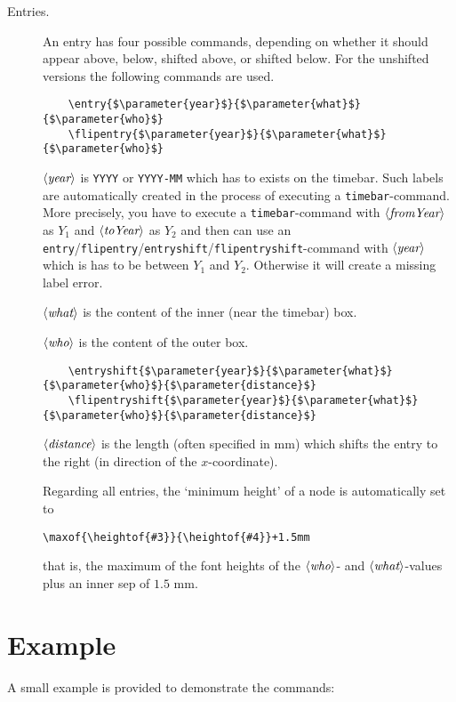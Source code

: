 \documentclass{article}
\newcommand{\parameter}[1]{\langle\normalfont\textit{#1}\rangle}
\begin{document}
\begin{description}
\item[Entries.] An entry has four possible commands, depending on whether it should appear above, below, shifted above, or shifted below. 
For the unshifted versions the following commands are used.
\begin{lstlisting}
	\entry{$\parameter{year}$}{$\parameter{what}$}{$\parameter{who}$}
	\flipentry{$\parameter{year}$}{$\parameter{what}$}{$\parameter{who}$}
\end{lstlisting}
$\parameter{year}$ is \texttt{YYYY} or \texttt{YYYY-MM} which has to exists on the timebar. 
Such labels are automatically created in the process of executing a \texttt{timebar}-command. 
More precisely, you have to execute a \texttt{timebar}-command with $\parameter{fromYear}$ as $Y_1$ and $\parameter{toYear}$ as $Y_2$ and then can use an \texttt{entry}/\texttt{flipentry}/\texttt{entryshift}/\texttt{flipentryshift}-command with $\parameter{year}$ which is has to be between $Y_1$ and $Y_2$.
Otherwise it will create a missing label error.

$\parameter{what}$ is the content of the inner (near the timebar) box.

$\parameter{who}$ is the content of the outer box.

\begin{lstlisting}
	\entryshift{$\parameter{year}$}{$\parameter{what}$}{$\parameter{who}$}{$\parameter{distance}$}
	\flipentryshift{$\parameter{year}$}{$\parameter{what}$}{$\parameter{who}$}{$\parameter{distance}$}
\end{lstlisting}

$\parameter{distance}$ is the length (often specified in mm) which shifts the entry to the right (in direction of the $x$-coordinate).

Regarding all entries, the `minimum height' of a node is automatically set to 
\begin{center}
\verb'\maxof{\heightof{#3}}{\heightof{#4}}+1.5mm'
\end{center}
that is, the maximum of the font heights of the $\parameter{who}$- and $\parameter{what}$-values plus an inner sep of $1.5$ mm.
\end{description}

\section{Example}
A small example is provided to demonstrate the commands:
\end{document}
